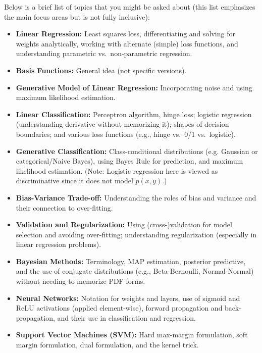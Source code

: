 \documentclass{article}
\begin{document}
Below is a brief list of topics that you might be asked about (this list emphasizes the main focus areas but is not fully inclusive):
\begin{itemize}
    \item \textbf{Linear Regression:} Least squares loss, differentiating and solving for weights analytically, working with alternate (simple) loss functions, and understanding parametric vs.\ non-parametric regression.
    \item \textbf{Basis Functions:} General idea (not specific versions).
    \item \textbf{Generative Model of Linear Regression:} Incorporating noise and using maximum likelihood estimation.
    \item \textbf{Linear Classification:} Perceptron algorithm, hinge loss; logistic regression (understanding derivative without memorizing it); shapes of decision boundaries; and various loss functions (e.g., hinge vs.\ 0/1 vs.\ logistic).
    \item \textbf{Generative Classification:} Class-conditional distributions (e.g. Gaussian or categorical/Naive Bayes), using Bayes Rule for prediction, and maximum likelihood estimation. (Note: Logistic regression here is viewed as discriminative since it does not model $p(x,y)$.)
    \item \textbf{Bias-Variance Trade-off:} Understanding the roles of bias and variance and their connection to over-fitting.
    \item \textbf{Validation and Regularization:} Using (cross-)validation for model selection and avoiding over-fitting; understanding regularization (especially in linear regression problems).
    \item \textbf{Bayesian Methods:} Terminology, MAP estimation, posterior predictive, and the use of conjugate distributions (e.g., Beta-Bernoulli, Normal-Normal) without needing to memorize PDF forms.
    \item \textbf{Neural Networks:} Notation for weights and layers, use of sigmoid and ReLU activations (applied element-wise), forward propagation and back-propagation, and their use in classification and regression.
    \item \textbf{Support Vector Machines (SVM):} Hard max-margin formulation, soft margin formulation, dual formulation, and the kernel trick.
\end{itemize}
\end{document}
